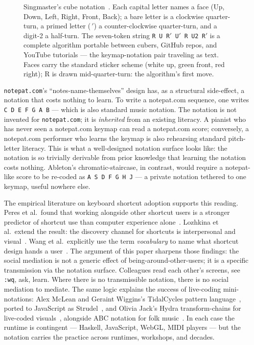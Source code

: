 \documentclass[10pt,letterpaper,twocolumn]{article}
\begin{document}
\begin{figure}[t]
\caption{Singmaster's cube notation~\citep{singmaster1981notes}. Each capital letter names a face (\textsf{U}p, \textsf{D}own, \textsf{L}eft, \textsf{R}ight, \textsf{F}ront, \textsf{B}ack); a bare letter is a clockwise quarter-turn, a primed letter ($\,'$) a counter-clockwise quarter-turn, and a digit-2 a half-turn. The seven-token string \texttt{R U R$'$ U$'$ R U2 R$'$} is a complete algorithm portable between cubers, GitHub repos, and YouTube tutorials --- the keymap-notation pair traveling as text. Faces carry the standard sticker scheme (white up, green front, red right); \textsf{R} is drawn mid-quarter-turn: the algorithm's first move.}
\label{fig:singmaster}
\end{figure}

\texttt{notepat.com}'s ``notes-name-themselves'' design has, as a structural side-effect, a notation that costs nothing to learn. To write a notepat.com sequence, one writes \texttt{C D E F G A B} --- which is also standard music notation. The notation is not invented for \texttt{notepat.com}; it is \emph{inherited} from an existing literacy. A pianist who has never seen a notepat.com keymap can read a notepat.com score; conversely, a notepat.com performer who learns the keymap is also rehearsing standard pitch-letter literacy. This is what a well-designed notation surface looks like: the notation is so trivially derivable from prior knowledge that learning the notation costs nothing. Ableton's chromatic-staircase, in contrast, would require a notepat-like score to be re-coded as \texttt{A S D F G H J} --- a private notation tethered to one keymap, useful nowhere else.

The empirical literature on keyboard shortcut adoption supports this reading. Peres et al.\ found that working alongside other shortcut users is a stronger predictor of shortcut use than computer experience alone~\citep{peres2004shortcut}. Lozhkina et al.\ extend the result: the discovery channel for shortcuts is interpersonal and visual~\citep{lozhkina2025discovery}. Wang et al.\ explicitly use the term \emph{vocabulary} to name what shortcut design hands a user~\citep{wang2020keymap}. The argument of this paper sharpens those findings: the social mediation is not a generic effect of being-around-other-users; it is a specific transmission via the notation surface. Colleagues read each other's screens, see \texttt{:wq}, ask, learn. Where there is no transmissible notation, there is no social mediation to mediate. The same logic explains the success of live-coding mini-notations: Alex McLean and Geraint Wiggins's TidalCycles pattern language~\citep{mclean2010tidal}, ported to JavaScript as Strudel~\citep{roos2023strudel}, and Olivia Jack's Hydra transform-chains for live-coded visuals~\citep{jack2018hydra}, alongside ABC notation for folk music~\citep{walshaw_abc}. In each case the runtime is contingent --- Haskell, JavaScript, WebGL, MIDI players --- but the notation carries the practice across runtimes, workshops, and decades.
\end{document}
